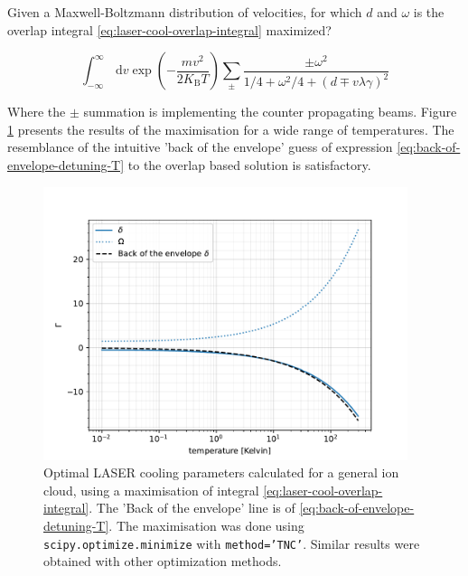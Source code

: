 Given a Maxwell-Boltzmann distribution of velocities, for which $d$ and $\omega$ is the overlap integral \ref{eq:laser-cool-overlap-integral} maximized?

\begin{equation}
	\int_{-\infty}^\infty\,\mathrm{d}v\exp\left(-\frac{m v^2}{2 K_\text{B} T}\right) \sum_\pm \frac{\pm\omega^2}{1/4 + \omega^2/4 + (d \mp v\lambda\gamma)^2}
	\label{eq:laser-cool-overlap-integral}
\end{equation}

Where the $\pm$ summation is implementing the counter propagating beams. Figure \ref{fig:laser-cool-optimal-overlap} presents the results of the maximisation for a wide range of temperatures. The resemblance of the intuitive 'back of the envelope' guess of expression \ref{eq:back-of-envelope-detuning-T} to the overlap based solution is satisfactory.

\begin{figure}
	\begin{center}
		\includegraphics[width=0.95\textwidth]{graphics/laser_cool_overlap.pdf}
	\end{center}
	\caption{Optimal LASER cooling parameters calculated for a general ion cloud, using a maximisation of integral \ref{eq:laser-cool-overlap-integral}. The 'Back of the envelope' line is of \ref{eq:back-of-envelope-detuning-T}. The maximisation was done using \texttt{scipy.optimize.minimize} with \texttt{method='TNC'}. Similar results were obtained with other optimization methods.}\label{fig:laser-cool-optimal-overlap}
\end{figure}

